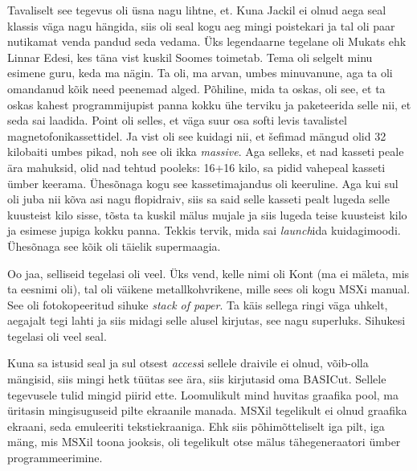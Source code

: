 Tavaliselt see tegevus oli üsna nagu lihtne, et. Kuna Jackil ei olnud aega seal klassis väga nagu hängida, siis oli seal kogu aeg mingi poistekari ja tal oli paar nutikamat venda pandud seda vedama. Üks legendaarne tegelane oli Mukats ehk Linnar Edesi, kes täna vist kuskil Soomes toimetab. Tema oli selgelt minu esimene guru, keda ma nägin. Ta oli, ma arvan, umbes minuvanune, aga ta oli omandanud kõik need peenemad alged. Põhiline, mida ta oskas, oli see, et ta oskas kahest programmijupist panna kokku ühe terviku ja  paketeerida selle nii, et seda sai laadida. Point oli selles, et väga suur osa softi levis tavalistel magnetofonikassettidel. Ja vist oli see kuidagi nii, et šefimad mängud olid  32 kilobaiti umbes pikad, noh see oli ikka \emph{massive}. Aga selleks, et nad kasseti peale ära mahuksid, olid nad tehtud pooleks: 16+16 kilo, sa pidid vahepeal kasseti ümber keerama. Ühesõnaga kogu see kassetimajandus oli keeruline. Aga kui sul oli juba nii kõva asi nagu flopidraiv, siis sa said selle kasseti pealt lugeda selle kuusteist kilo sisse, tõsta ta kuskil mälus mujale ja siis lugeda teise kuusteist kilo ja esimese jupiga kokku panna. Tekkis  tervik, mida sai \emph{launch}ida kuidagimoodi. Ühesõnaga see kõik oli täielik supermaagia. 


Oo jaa, selliseid tegelasi oli veel. Üks vend, kelle nimi oli Kont (ma ei mäleta, mis ta eesnimi oli), tal oli väikene metallkohvrikene, mille sees oli kogu MSXi manual. See oli fotokopeeritud sihuke \emph{stack of paper}. Ta käis sellega ringi väga uhkelt, aegajalt tegi lahti ja siis midagi selle alusel kirjutas, see nagu superluks. Sihukesi tegelasi oli veel seal. 

Kuna sa istusid seal ja sul otsest \emph{access}i sellele draivile ei olnud, võib-olla  mängisid, siis mingi hetk tüütas see ära, siis kirjutasid oma BASICut. Sellele tegevusele tulid mingid piirid ette. Loomulikult mind huvitas graafika pool, ma üritasin mingisuguseid pilte ekraanile manada. MSXil  tegelikult ei olnud graafika ekraani,  seda emuleeriti tekstiekraaniga. Ehk siis  põhimõtteliselt iga pilt, iga mäng, mis MSXil toona jooksis, oli tegelikult otse mälus tähegeneraatori ümber programmeerimine. 


